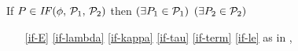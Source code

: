   \noindent
  If $\aPS \in \sIF{\aForm}\sTHEN\aPSS_1\sELSE\aPSS_2\sFI$ then
  $(\exists P_1\in\mathcal{P}_1)$ $(\exists P_2\in\mathcal{P}_2)$
  \begin{multicols}{2}
    \begin{enumerate}[topsep=0pt,label=(\textsc{i}\arabic*),ref=\textsc{i}\arabic*]
    \item[\eqref{if-E}]
      \eqref{if-lambda}\;
      \eqref{if-kappa}\;
      \eqref{if-tau}\;
      \eqref{if-term}\; 
      \eqref{if-le}\; as in ,
      \setcounter{enumi}{\value{le}}

\end{enumerate}
\end{multicols}
